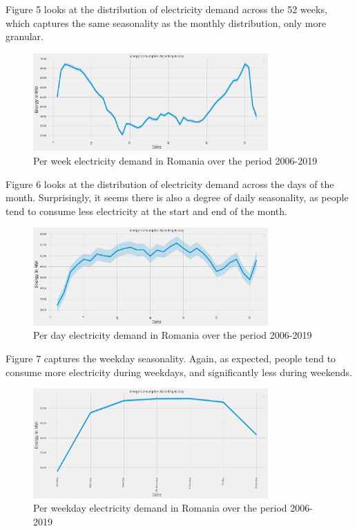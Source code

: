 \documentclass[10pt,twocolumn,letterpaper]{article}
\begin{document}
Figure 5 looks at the distribution of electricity demand across the 52 weeks, which captures the same seasonality as the monthly distribution, only more granular.

\begin{figure}[H]
\begin{center}
   \includegraphics[width=9cm]{final-report-latex/Week.png}
   \caption{Per week electricity demand in Romania over the period 2006-2019}
   \end{center}
\end{figure}

Figure 6 looks at the distribution of electricity demand across the days of the month. Surprisingly, it seems there is also a degree of daily seasonality, as people tend to consume less electricity at the start and end of the month.
\begin{figure}[H]
\begin{center}
   \includegraphics[width=9cm]{final-report-latex/Day.png}
   \caption{Per day electricity demand in Romania over the period 2006-2019}
   \end{center}
\end{figure}

Figure 7 captures the weekday seasonality. Again, as expected, people tend to consume more electricity during weekdays, and significantly less during weekends.

\begin{figure}[H]
\begin{center}
   \includegraphics[width=9cm]{final-report-latex/Weekday.png}
   \caption{Per weekday electricity demand in Romania over the period 2006-2019}
   \end{center}
\end{figure}
\end{document}
